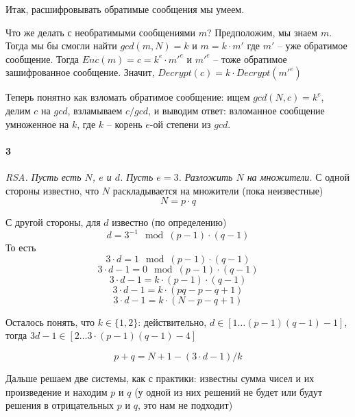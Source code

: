 \documentclass[russian]{article}
\begin{document}
Итак, расшифровывать обратимые сообщения мы умеем.

Что же делать с необратимыми сообщениями $m$? Предположим, мы знаем $m$. Тогда мы бы смогли найти $gcd(m, N) = k$ и $m = k \cdot m'$ где $m'$ -- уже обратимое сообщение. Тогда $Enc(m) = c =k^e \cdot m'^e$ и $m'^e$ -- тоже обратимое зашифрованное сообщение. Значит, $Decrypt(c) = k \cdot Decrypt(m'^e)$

Теперь понятно как взломать обратимое сообщение: ищем $gcd(N, c) = k^e$, делим $c$ на $gcd$, взламываем $c/gcd$, и выводим ответ: взломанное сообщение умноженное на $k$, где $k$ -- корень $e$-ой степени из $gcd$.

\paragraph*{3}

\textit{RSA. Пусть есть $N$, $e$ и $d$. Пусть $e = 3$. Разложить $N$ на множители.}
С одной стороны известно, что $N$ раскладывается на множители (пока неизвестные)
\[N = p \cdot q \]

С другой стороны, для $d$ известно (по определению)
\[d = 3 ^ {-1} \mod (p-1) \cdot (q-1) \]
То есть 
\[3 \cdot d = 1 \mod (p-1) \cdot (q-1) \]
\[3 \cdot d - 1 = 0 \mod (p-1) \cdot (q-1) \]
\[3 \cdot d - 1 = k \cdot (p-1) \cdot (q-1) \]
\[3 \cdot d - 1 = k \cdot (pq-p-q+1)\]
\[3 \cdot d - 1 = k \cdot (N-p-q+1)\]

Осталось понять, что $k \in \{1, 2\}$: действительно, $d \in [1 \ldots (p-1)(q-1)-1]$, тогда $3d-1 \in [2 \ldots 3 \cdot (p-1)(q-1)-4]$

\[p + q = N + 1 - (3 \cdot d - 1)/k \]

Дальше решаем две системы, как с практики: известны сумма чисел и их произведение и находим $p$ и $q$ (у одной из них решений не будет или будут решения в отрицательных $p$ и $q$, это нам не подходит)
\end{document}
